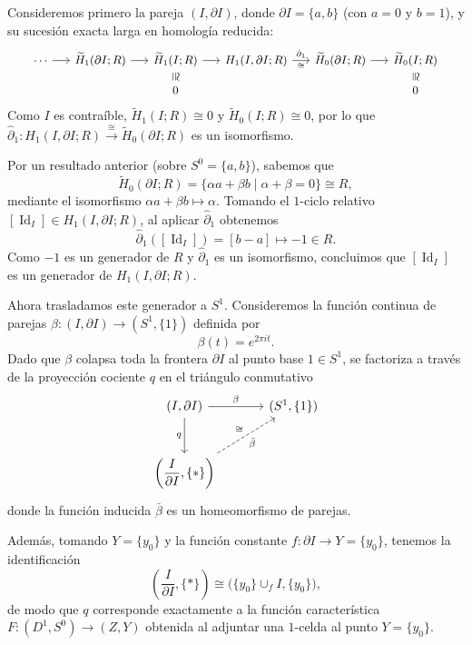 \begin{ejemplo}

Consideremos primero la pareja $(I, \partial I)$, donde $\partial I = \{a, b\}$ (con $a = 0$ y $b = 1$), y su sucesión exacta larga en homología reducida:
\[
{\small
\begin{tikzcd}[column sep=1.5em, row sep=1.0em]
\cdots \arrow[r]
& \widetilde{H}_1(\partial I; R) \arrow[r]
& \widetilde{H}_1(I; R)
    \arrow[r]
    \arrow[d, phantom, "\cong"{description, sloped, inner sep=1pt}]
& H_1(I, \partial I; R) \arrow[r, "\hat{\partial}_1", "\cong"']
& \widetilde{H}_0(\partial I; R) \arrow[r]
& \widetilde{H}_0(I; R)
    \arrow[d, phantom, "\cong"{description, sloped, inner sep=1pt}] \\
& & 0 & & & 0
\end{tikzcd}}
\]
Como $I$ es contraíble, $\widetilde{H}_1(I; R) \cong 0$ y $\widetilde{H}_0(I; R) \cong 0$, por lo que $\hat{\partial}_1 \colon H_1(I, \partial I; R) \xrightarrow{\;\cong\;} \widetilde{H}_0(\partial I; R)$ es un isomorfismo.

Por un resultado anterior (sobre $S^0 = \{a, b\}$), sabemos que
\[
\widetilde{H}_0(\partial I; R) = \{\alpha a + \beta b \mid \alpha + \beta = 0\} \cong R,
\]
mediante el isomorfismo $\alpha a + \beta b \mapsto \alpha$. Tomando el $1$-ciclo relativo $[\operatorname{Id}_I] \in H_1(I, \partial I; R)$, al aplicar $\hat{\partial}_1$ obtenemos
\[
\hat{\partial}_1([\operatorname{Id}_I]) = [b - a] \longmapsto -1 \in R.
\]
Como $-1$ es un generador de $R$ y $\hat{\partial}_1$ es un isomorfismo, concluimos que $[\operatorname{Id}_I]$ es un generador de $H_1(I, \partial I; R)$.

Ahora trasladamos este generador a $S^1$. Consideremos la función continua de parejas $\beta \colon (I, \partial I) \to (S^1, \{1\})$ definida por
\[
\beta(t) = e^{2\pi i t}.
\]
Dado que $\beta$ colapsa toda la frontera $\partial I$ al punto base $1 \in S^1$, se factoriza a través de la proyección cociente $q$ en el triángulo conmutativo
\[
\begin{tikzcd}[column sep=3.4em, row sep=2.8em]
(I, \partial I)
    \arrow[r, "\beta"]
    \arrow[d, "q"']
& (S^1, \{1\}) \\
\left(\dfrac{I}{\partial I}, \{*\}\right)
    \arrow[ur, dashed, "\bar{\beta}"', "\cong"]
&
\end{tikzcd}
\]
donde la función inducida $\bar{\beta}$ es un homeomorfismo de parejas.

Además, tomando $Y = \{y_0\}$ y la función constante $f \colon \partial I \to Y = \{y_0\}$, tenemos la identificación
\[
\left(\frac{I}{\partial I}, \{*\}\right) \cong \bigl(\{y_0\} \cup_f I, \{y_0\}\bigr),
\]
de modo que $q$ corresponde exactamente a la función característica $F \colon (D^1, S^0) \to (Z, Y)$ obtenida al adjuntar una $1$-celda al punto $Y = \{y_0\}$.


\end{ejemplo}
